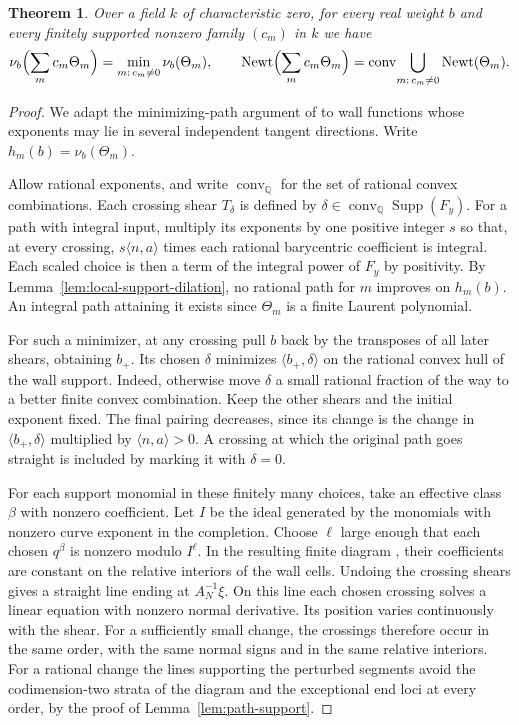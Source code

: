 \documentclass[11pt,reqno]{amsart}
\numberwithin{equation}{section}
\newtheorem{theorem}{Theorem}[section]
\theoremstyle{definition}
\theoremstyle{remark}
\DeclareMathOperator{\Newt}{Newt}
\DeclareMathOperator{\Supp}{Supp}
\begin{document}
\begin{theorem}\label{thm:marked-path-vi}
Over a field \(k\) of characteristic zero, for every real weight \(b\)
and every finitely supported nonzero family \((c_m)\) in \(k\) we have
\[ \nu_b\Bigl(\sum_m c_m\Theta_m\Bigr)=\min_{m:\,c_m\ne0}\nu_b(\Theta_m),\qquad \Newt \Bigl(\sum_m c_m\Theta_m\Bigr) =\operatorname{conv}\!\bigcup_{m:\,c_m\ne0}\Newt (\Theta_m). \]
\end{theorem}
\begin{proof}
We adapt the minimizing-path argument of \cite[\S3]{CMMM} to wall
functions whose exponents may lie in several independent tangent
directions. Write \(h_m(b)=\nu_b(\Theta_m)\).

Allow rational exponents, and write \(\operatorname{conv}_{\mathbb Q}\)
for the set of rational convex combinations. Each crossing shear
\(T_\delta\) is defined by \(\delta\in\operatorname{conv}_{\mathbb Q}
\Supp(F_y)\). For a path with integral input, multiply
its exponents by one positive integer \(s\) so that, at every
crossing, \(s\langle n,a\rangle\) times each rational barycentric
coefficient is integral. Each scaled choice is then a term of the
integral power of \(F_y\) by positivity. By Lemma~\ref{lem:local-support-dilation}, no
rational path for \(m\) improves on \(h_m(b)\). An integral path
attaining it exists since \(\Theta_m\) is a finite Laurent polynomial.

For such a minimizer, at any crossing pull \(b\) back by the transposes
of all later shears, obtaining \(b_+\). Its chosen \(\delta\) minimizes
\(\langle b_+,\delta\rangle\) on the rational convex hull of the
wall support. Indeed, otherwise move \(\delta\) a small rational
fraction of the way to a better finite convex combination. Keep the other shears and the initial exponent fixed. The final pairing decreases,
since its change is the change in \(\langle b_+,\delta\rangle\)
multiplied by \(\langle n,a\rangle>0\). A crossing at which the
original path goes straight is included by marking it with \(\delta=0\).

For each support monomial in these finitely many choices, take an
effective class \(\beta\) with nonzero coefficient. Let \(I\) be the
ideal generated by the monomials with nonzero curve exponent in the
completion. Choose \(\ell\) large enough that each chosen \(q^\beta\)
is nonzero modulo \(I^\ell\). In the resulting finite diagram
\cite[Proposition~20.17]{KY}, their coefficients are constant on the
relative interiors of the wall cells. Undoing the crossing shears gives
a straight line ending at \(A_N^{-1}\xi\). On this line each chosen crossing solves a linear equation
with nonzero normal derivative. Its position varies continuously
with the shear. For a sufficiently small change, the crossings
therefore occur in the same order, with the same normal signs and
in the same relative interiors. For a rational change the lines
supporting the perturbed segments avoid the codimension-two strata of the diagram
and the exceptional end loci at every order, by
the proof of Lemma~\ref{lem:path-support}.


\end{proof}
\end{document}
